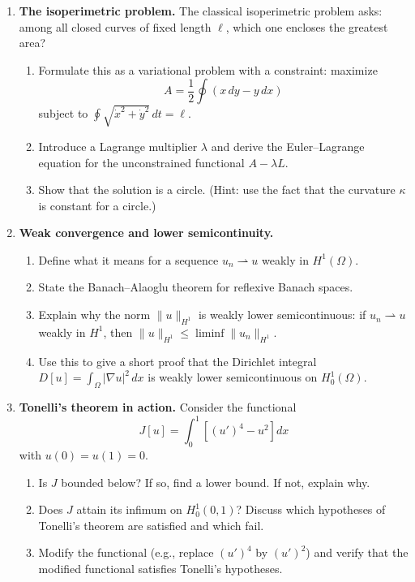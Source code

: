 \begin{enumerate}
    \item \textbf{The isoperimetric problem.}
    The classical isoperimetric problem asks: among all closed curves of fixed length $\ell$, which one encloses the greatest area?
    \begin{enumerate}
        \item Formulate this as a variational problem with a constraint: maximize
        \[
            A = \frac{1}{2} \oint (x \, dy - y \, dx)
        \]
        subject to $\oint \sqrt{\dot{x}^2 + \dot{y}^2} \, dt = \ell$.
        \item Introduce a Lagrange multiplier $\lambda$ and derive the Euler--Lagrange equation for the unconstrained functional $A - \lambda L$.
        \item Show that the solution is a circle. (Hint: use the fact that the curvature $\kappa$ is constant for a circle.)
    \end{enumerate}

    \item \textbf{Weak convergence and lower semicontinuity.}
    \begin{enumerate}
        \item Define what it means for a sequence $u_n \rightharpoonup u$ weakly in $H^1(\Omega)$.
        \item State the Banach--Alaoglu theorem for reflexive Banach spaces.
        \item Explain why the norm $\|u\|_{H^1}$ is weakly lower semicontinuous: if $u_n \rightharpoonup u$ weakly in $H^1$, then $\|u\|_{H^1} \leq \liminf \|u_n\|_{H^1}$.
        \item Use this to give a short proof that the Dirichlet integral $D[u] = \int_\Omega |\nabla u|^2 \, dx$ is weakly lower semicontinuous on $H^1_0(\Omega)$.
    \end{enumerate}

    \item[$\star$] \textbf{Tonelli's theorem in action.}
    Consider the functional
    \[
        J[u] = \int_0^1 \left[ (u')^4 - u^2 \right] dx
    \]
    with $u(0) = u(1) = 0$.
    \begin{enumerate}
        \item Is $J$ bounded below? If so, find a lower bound. If not, explain why.
        \item Does $J$ attain its infimum on $H^1_0(0,1)$? Discuss which hypotheses of Tonelli's theorem are satisfied and which fail.
        \item Modify the functional (e.g., replace $(u')^4$ by $(u')^2$) and verify that the modified functional satisfies Tonelli's hypotheses.
    \end{enumerate}


\end{enumerate}
